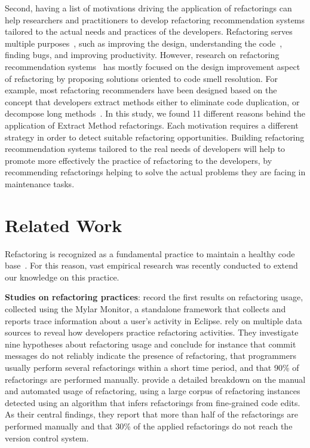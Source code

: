 Second, having a list of motivations driving the application of refactorings can help researchers and practitioners
to develop refactoring recommendation systems tailored to the actual needs and practices of the developers.
Refactoring serves multiple purposes~\citep{Fowler:1999}, such as improving the design, understanding the code~\citep{DuBois:2005}, finding bugs, and improving productivity.
However, research on refactoring recommendation systems~\citep{Bavota:2015} has mostly focused on the design improvement aspect of refactoring by
proposing solutions oriented to code smell resolution.
For example, most refactoring recommenders have been designed based on the concept that developers extract methods either to eliminate code duplication, or decompose long methods~\citep{Tsantalis:2011, Silva:2014, Tairas:2012, Hotta:2012, Meng:2015, Tsantalis:2015}.
In this study, we found 11 different reasons behind the application of {\textsc Extract Method} refactorings.
Each motivation requires a different strategy in order to detect suitable refactoring opportunities.
Building refactoring recommendation systems tailored to the real needs of developers will help to promote more effectively the practice of refactoring to the developers,
by recommending refactorings helping to solve the actual problems they are facing in maintenance tasks.



\section{Related Work}

Refactoring is recognized as a fundamental practice to maintain a healthy code base~\citep{Fowler:1999,Beck:1999,Opdyke:1992,mens:survey:2004}.
For this reason, vast empirical research was recently conducted to extend our knowledge on this practice.

\noindent\textbf{Studies on refactoring practices}:
\cite{Murphy:2006} record the first results on refactoring usage, collected using the Mylar Monitor, a standalone framework that collects and reports trace information about a user's activity in Eclipse.
\cite{MurphyHill2012} rely on multiple data sources to reveal how developers practice refactoring activities.
They investigate nine hypotheses about refactoring usage and conclude for instance that commit messages do not reliably indicate the presence of refactoring,
that programmers usually perform several refactorings within a short time period, and that 90\% of refactorings are performed manually.
\cite{negara2013} provide a detailed breakdown on the manual and automated usage of refactoring, using a large corpus of refactoring instances detected using an algorithm that infers refactorings from fine-grained code edits.
As their central findings, they report that more than half of the refactorings are performed manually and that 30\% of the applied refactorings do not reach the version control system.

